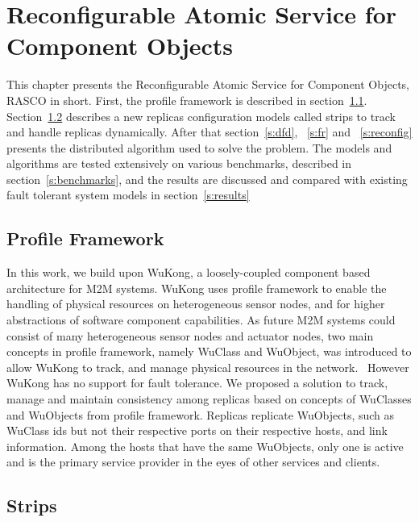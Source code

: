\cleardoublepage
\singlespacing
\chapter{Reconfigurable Atomic Service for Component Objects}
\label{c:rasco}
\doublespacing\nointerlineskip

This chapter presents the Reconfigurable Atomic Service for Component Objects,
RASCO in short. First, the profile framework is described in section~\ref{s:pf}.
Section~\ref{s:ss} describes a new replicas configuration models called strips
to track and handle replicas dynamically. After that section~\ref{s:dfd},
~\ref{s:fr} and ~\ref{s:reconfig} presents the distributed algorithm used to
solve the problem. The models and algorithms are tested extensively on various
benchmarks, described in section~\ref{s:benchmarks}, and the results are
discussed and compared with existing fault tolerant system models in
section~\ref{s:results}

\section{Profile Framework}
\label{s:pf}

In this work, we build upon WuKong, a loosely-coupled component based
architecture for M2M systems. WuKong uses profile
framework to enable the handling of physical resources on heterogeneous sensor
nodes, and for higher abstractions of software component capabilities. As
future M2M systems could consist of many heterogeneous sensor nodes and
actuator nodes, two main concepts in profile framework, namely WuClass and
WuObject, was introduced to allow WuKong to track, and manage physical
resources in the network.~\cite{Reijers} However WuKong has no support for
fault tolerance. We proposed a solution to track, manage and maintain
consistency among replicas based on concepts of WuClasses and WuObjects from
profile framework. Replicas replicate WuObjects, such as WuClass ids but not
their respective ports on their respective hosts, and link information. Among
the hosts that have the same WuObjects, only one is active and is the primary
service provider in the eyes of other services and clients.

\section{Strips} %
\label{s:ss}

